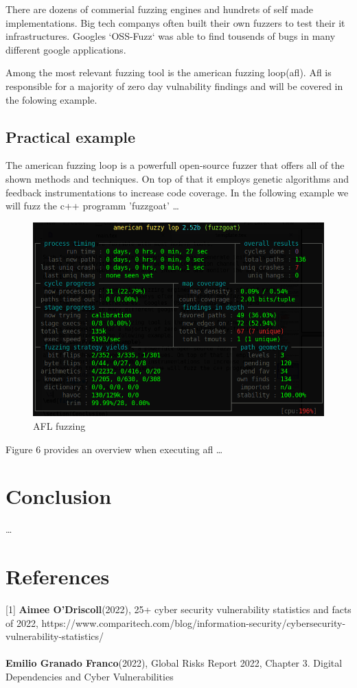 \documentclass[journal=tosc,final]{iacrtrans}
\begin{document}
There are dozens of commerial fuzzing engines and hundrets of self made implementations. Big tech companys often built their own fuzzers to test their it infrastructures. Googles `OSS-Fuzz` was able to find tousends of bugs in many different google applications. 

Among the most relevant fuzzing tool is the american fuzzing loop(afl).
Afl is responsible for a majority of zero day vulnability findings and will be covered in the folowing example.
\subsection{Practical example}
The american fuzzing loop is a powerfull open-source fuzzer that offers all of the shown methods and techniques. On top of that it employs genetic algorithms and feedback instrumentations to increase code coverage. In the following example we will fuzz the c++ programm 'fuzzgoat' \dots
\begin{figure}[h]
 \caption{AFL fuzzing}
 \centering
 \includegraphics[scale=0.3]{afl.png}
\end{figure}

Figure 6 provides an overview when executing afl \dots
\newpage
\section{Conclusion}
\dots
\newpage
\section{References}
[1] \textbf{Aimee O'Driscoll}(2022), 25+ cyber security vulnerability statistics and facts of 2022, https://www.comparitech.com/blog/information-security/cybersecurity-vulnerability-statistics/\\
\\
\noindent[2] \textbf{Emilio Granado Franco}(2022),  Global Risks Report 2022, Chapter 3. Digital Dependencies and Cyber Vulnerabilities\\
\end{document}

